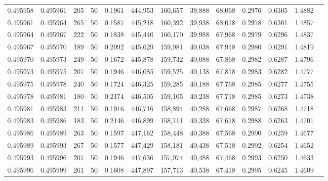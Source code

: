 \begin{tabular}{rrrrrrrrrrrrr}
0.495958 & 0.495961 &   205 &  50 &                                     0.1961 & 444,953 & 160,657 &  39,888 &  68,068 & 0.2976 & 0.6305 & 1.4882 \\
0.495961 & 0.495964 &   265 &  50 &                                     0.1587 & 445,218 & 160,392 &  39,938 &  68,018 & 0.2978 & 0.6301 & 1.4857 \\
0.495964 & 0.495967 &   222 &  50 &                                     0.1838 & 445,440 & 160,170 &  39,988 &  67,968 & 0.2979 & 0.6296 & 1.4837 \\
0.495967 & 0.495970 &   189 &  50 &                                     0.2092 & 445,629 & 159,981 &  40,038 &  67,918 & 0.2980 & 0.6291 & 1.4819 \\
0.495970 & 0.495973 &   249 &  50 &                                     0.1672 & 445,878 & 159,732 &  40,088 &  67,868 & 0.2982 & 0.6287 & 1.4796 \\
0.495973 & 0.495975 &   207 &  50 &                                     0.1946 & 446,085 & 159,525 &  40,138 &  67,818 & 0.2983 & 0.6282 & 1.4777 \\
0.495975 & 0.495978 &   240 &  50 &                                     0.1724 & 446,325 & 159,285 &  40,188 &  67,768 & 0.2985 & 0.6277 & 1.4755 \\
0.495978 & 0.495981 &   180 &  50 &                                     0.2174 & 446,505 & 159,105 &  40,238 &  67,718 & 0.2985 & 0.6273 & 1.4738 \\
0.495981 & 0.495983 &   211 &  50 &                                     0.1916 & 446,716 & 158,894 &  40,288 &  67,668 & 0.2987 & 0.6268 & 1.4718 \\
0.495983 & 0.495986 &   183 &  50 &                                     0.2146 & 446,899 & 158,711 &  40,338 &  67,618 & 0.2988 & 0.6263 & 1.4701 \\
0.495986 & 0.495989 &   263 &  50 &                                     0.1597 & 447,162 & 158,448 &  40,388 &  67,568 & 0.2990 & 0.6259 & 1.4677 \\
0.495989 & 0.495993 &   267 &  50 &                                     0.1577 & 447,429 & 158,181 &  40,438 &  67,518 & 0.2992 & 0.6254 & 1.4652 \\
0.495993 & 0.495996 &   207 &  50 &                                     0.1946 & 447,636 & 157,974 &  40,488 &  67,468 & 0.2993 & 0.6250 & 1.4633 \\
0.495996 & 0.495999 &   261 &  50 &                                     0.1608 & 447,897 & 157,713 &  40,538 &  67,418 & 0.2995 & 0.6245 & 1.4609 \\

\end{tabular}
